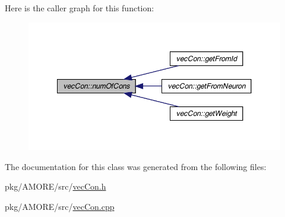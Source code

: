 Here is the caller graph for this function:\nopagebreak
\begin{figure}[H]
\begin{center}
\leavevmode
\includegraphics[width=348pt]{classvec_con_a1e39a5e78c40ae8af9bbd2fd7f0dc749_icgraph}
\end{center}
\end{figure}




The documentation for this class was generated from the following files:\begin{DoxyCompactItemize}
\item 
pkg/AMORE/src/\hyperlink{vec_con_8h}{vecCon.h}\item 
pkg/AMORE/src/\hyperlink{vec_con_8cpp}{vecCon.cpp}\end{DoxyCompactItemize}
